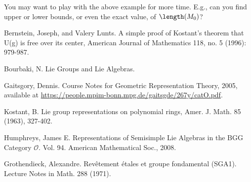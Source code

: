 	You may want to play with the above example for more time. E.g., can you find upper or lower bounds, or even the exact value, of $\length(M_0)$?


	
\begin{thebibliography}{Yau}
	
	 Bernstein, Joseph, and Valery Lunts. A simple proof of Kostant's theorem that U(g) is free over its center, American Journal of Mathematics 118, no. 5 (1996): 979-987.

	 Bourbaki, N. Lie Groups and Lie Algebras.

	 Gaitsgory, Dennis. Course Notes for Geometric Representation Theory, 2005, available at \url{https://people.mpim-bonn.mpg.de/gaitsgde/267y/catO.pdf}.

	 Kostant, B. Lie group representations on polynomial rings, Amer. J. Math. 85 (1963), 327-402.

	 Humphreys, James E. Representations of Semisimple Lie Algebras in the BGG Category $\mathcal{O} $. Vol. 94. American Mathematical Soc., 2008.

	 Grothendieck, Alexandre. Revêtement étales et groupe fondamental (SGA1). Lecture Notes in Math. 288 (1971).


\end{thebibliography}

 



